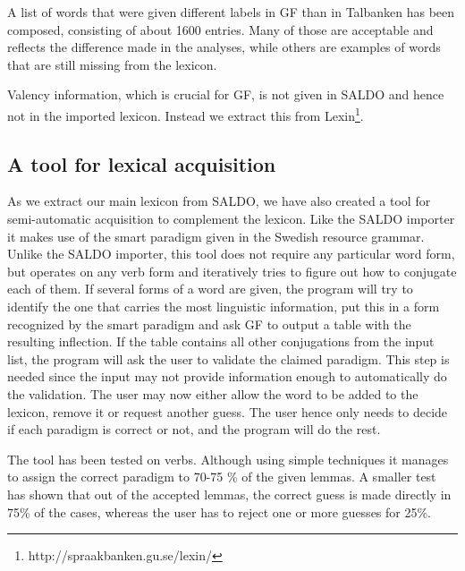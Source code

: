 \documentclass[10pt, a4paper]{article}
\begin{document}
A list of words that were given different labels in GF than in Talbanken has been
composed, consisting of about 1600 entries. Many of those are
acceptable and reflects the difference 
made in the analyses, while
others are examples of words that are still missing from
the lexicon.

Valency information, which is crucial for GF, is not given in SALDO and
hence not in the imported lexicon. Instead we extract this from
Lexin\footnote{http://spraakbanken.gu.se/lexin/}.


\subsection{A tool for lexical acquisition}
As we extract our main lexicon from SALDO, we have also created a tool for
semi-automatic acquisition to complement the lexicon.
Like the SALDO importer it makes use of
the smart paradigm given in the Swedish resource grammar.
Unlike the SALDO importer, this tool does not require any particular
word form, but operates on any verb form and 
iteratively tries to figure out how to conjugate each of them. If several forms
of a word are 
given, the program will try to identify the one that carries the most linguistic
information, put this in a form recognized by the smart paradigm and ask GF to output
a table with the resulting inflection. 
If the table contains all other conjugations from the input list,
the program will ask the  user to
validate the claimed paradigm. 
This step is needed since the input may not provide information enough
to automatically do the validation. The user may now either
allow the word to be added to the lexicon, remove it or request another guess.
The user hence only needs to decide if each paradigm is correct or not, and
the program will do the rest.

The tool has been tested on verbs. Although using simple techniques it 
manages to assign the correct paradigm to 70-75 \% of the given lemmas.
A smaller test has shown that out of the accepted lemmas, the correct guess is
made directly in 75\% of the cases, whereas the user has to reject one or more
guesses for 25\%. 


\end{document}
